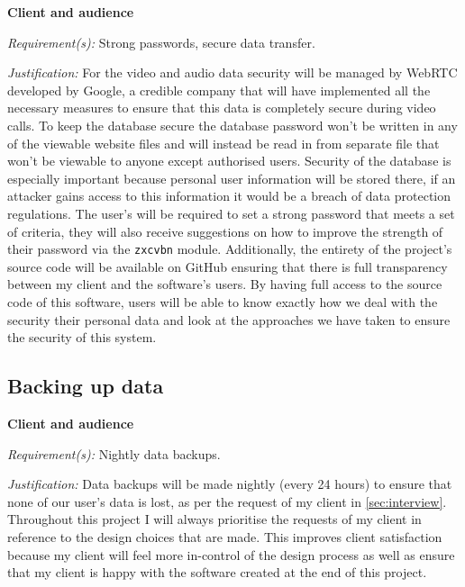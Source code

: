 \textsf{\bfseries Client and audience} \\ \vspace{0.1cm}

\textit{Requirement(s):} Strong passwords, secure data 
transfer. \\ \vspace{0.1cm}

\textit{Justification:}
For the video and audio data security will be managed by 
WebRTC developed by Google, a credible company that will have
implemented all the necessary measures to ensure that this
data is completely secure during video calls. To keep the 
database secure the database password won't be written in any
of the viewable website files and will instead be read in from
separate file that won't be viewable to anyone except 
authorised users. Security of the database is especially 
important because personal user information will be stored 
there, if an attacker gains access to this information it 
would be a breach of data protection regulations. 
The user's will be required to set a strong password that 
meets a set of criteria, they will also receive suggestions
on how to improve the strength of their password via the 
\texttt{zxcvbn} module. Additionally, the entirety of the
project's source code will be available on GitHub 
ensuring that there is full transparency between my client 
and the software's users. By having full access to the source
code of this software, users will be able to know exactly how
we deal with the security their personal data and look at the 
approaches we have taken to ensure the security of this
system. 

\subsection{Backing up data}

\textsf{\bfseries Client and audience} \\ \vspace{0.1cm}

\textit{Requirement(s):} Nightly data backups. \\ \vspace{0.1cm}

\textit{Justification:}
Data backups will be made nightly (every 24 hours) to ensure
that none of our user's data is lost, as per the request of
my client in \ref{sec:interview}. Throughout this project I 
will always prioritise the requests of my client in reference
to the design choices that are made. This improves client 
satisfaction because my client will feel more in-control of
the design process as well as ensure that my client is happy
with the software created at the end of this project.

